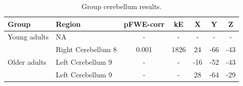 \documentclass[a4paper,fleqn]{cas-sc}
\begin{document}
\begin{table}[h!]
\centering
\begin{tabular}{|l|l|c|c|c|c|c|}
\hline
\rowcolor[HTML]{D0D0D0} 
\textbf{Group}       & \textbf{Region}         & \textbf{pFWE-corr} & \textbf{kE} & \textbf{X} & \textbf{Y}  & \textbf{Z}  \\ \hline
Young adults         & NA                     & -                  & -           & -          & -           & -           \\ \hline
\multirow{3}{*}{Older adults} 
                    & Right Cerebellum 8     & 0.001              & 1826        & 24         & -66         & -43         \\ 
                    & Left Cerebellum 9      & -                  & -           & -16        & -52         & -43         \\ 
                    & Left Cerebellum 9      & -                  & -           & 28         & -64         & -29         \\ \hline
\end{tabular}
\caption{Group cerebellum results.}
\label{tab:Group cerebellum}
\end{table}
\end{document}
